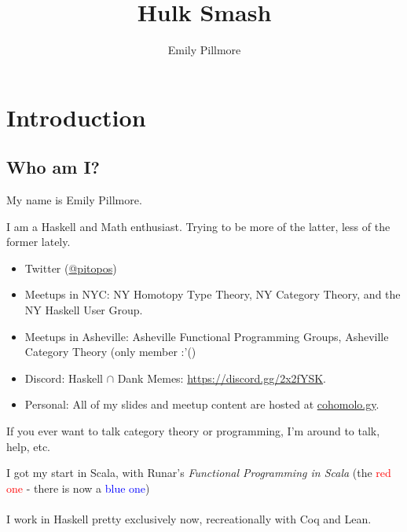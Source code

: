\documentclass[tikz]{beamer}
\theoremstyle{definition}
\begin{document}
\title{Hulk Smash}
\author{Emily Pillmore}

\frame{\titlepage}

\section[Outline]{}
\frame{ \tableofcontents[hideallsubsections] }

\section{Introduction}
\subsection{Who am I?}

\frame
{
	My name is Emily Pillmore.
	
	I am a Haskell and Math enthusiast. Trying to be more of the latter, less of the former lately.
}

\frame
{
	\begin{itemize}
		\item Twitter (\href{https://twitter.com/pitopos}{@pitopos})
		\item Meetups in NYC: NY Homotopy Type Theory, NY Category Theory, and the NY Haskell User Group. 
		\item Meetups in Asheville: Asheville Functional Programming Groups, Asheville Category Theory (only member :'()
		\item Discord: Haskell $\cap$ Dank Memes: \href{https://discord.gg/2x2fYSK}{https://discord.gg/2x2fYSK}. 
		\item Personal: All of my slides and meetup content are hosted at \href{https://github.com/cohomolo-gy}{cohomolo.gy}.
	\end{itemize}
	
	
	If you ever want to talk category theory or programming, I'm around to talk, help, etc. 
}

\frame
{
	I got my start in Scala, with Runar's \textit{Functional Programming in Scala} (the \textcolor{red}{red one} - there is now a \textcolor{blue}{blue one})
	\\
	\\
	I work in Haskell pretty exclusively now, recreationally with Coq and Lean.
}
\end{document}
